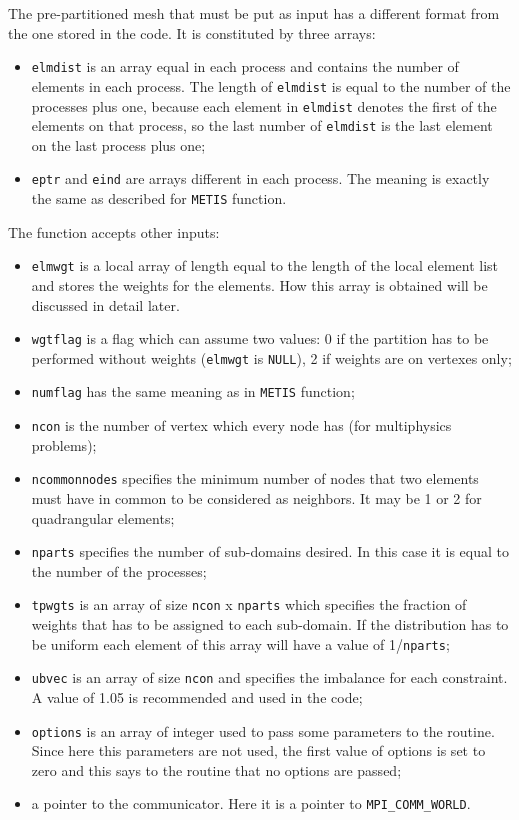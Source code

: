 The pre-partitioned mesh that must be put as input has a different format from the one stored in the code. It is constituted by three arrays:

\begin{itemize}
\item \verb|elmdist| is an array equal in each process and contains the number of elements in each process. The length of \verb|elmdist| is equal to the number of the processes plus one, because each element in \verb|elmdist| denotes the first of the elements on that process, so the last number of \verb|elmdist| is the last element on the last process plus one;
\item \verb|eptr| and \verb|eind| are arrays different in each process. The meaning is exactly the same as described for \verb|METIS| function.
\end{itemize}

The function accepts other inputs:

\begin{itemize}
\item \verb|elmwgt| is a local array of length equal to the length of the local element list and stores the weights for the elements. How this array is obtained will be discussed in detail later.
\item \verb|wgtflag| is a flag which can assume two values: 0 if the partition has to be performed without weights (\verb|elmwgt| is \verb|NULL|), 2 if weights are on vertexes only;
\item \verb|numflag| has the same meaning as in \verb|METIS| function;
\item \verb|ncon| is the number of vertex which every node has (for multiphysics problems);
\item \verb|ncommonnodes| specifies the minimum number of nodes that two elements must have in common to be considered as neighbors. It may be 1 or 2 for quadrangular elements;
\item \verb|nparts| specifies the number of sub-domains desired. In this case it is equal to the number of the processes;
\item \verb|tpwgts| is an array of size \verb|ncon| x \verb|nparts| which specifies the fraction of weights that has to be assigned to each sub-domain. If the distribution has to be uniform each element of this array will have a value of 1/\verb|nparts|;
\item \verb|ubvec| is an array of size \verb|ncon| and specifies the imbalance for each constraint. A value of 1.05 is recommended and used in the code;
\item \verb|options| is an array of integer used to pass some parameters to the routine. Since here this parameters are not used, the first value of options is set to zero and this says to the routine that no options are passed;
\item a pointer to the communicator. Here it is a pointer to \verb|MPI_COMM_WORLD|.
\end{itemize}

